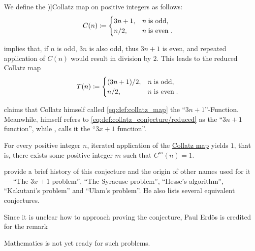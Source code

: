 \begin{definition}\label{def:collatz_map}
  We define the \term[en=Collatz function (\cite[1]{Lagarias2021CollatzOverview})]{Collatz map} on positive integers as follows:
  \begin{equation}\label{eq:def:collatz_map}
    C(n) \coloneqq \begin{cases}
      3n + 1, &n \T{is odd}, \\
      n / 2,  &n \T{is even}.
    \end{cases}
  \end{equation}
\end{definition}
\begin{comments}
  \item {} implies that, if \( n \) is odd, \( 3n \) is also odd, thus \( 3n + 1 \) is even, and repeated application of \( C(n) \) would result in division by \( 2 \). This leads to the reduced Collatz map
  \begin{equation}\label{eq:def:collatz_conjecture/reduced}
    T(n) \coloneqq \begin{cases}
      (3n + 1) / 2, &n \T{is odd}, \\
      n / 2,        &n \T{is even}.
    \end{cases}
  \end{equation}

  \item {} claims that Collatz himself called \eqref{eq:def:collatz_map} the \enquote{\( 3n + 1 \)}-Function. Meanwhile,  himself refers to \eqref{eq:def:collatz_conjecture/reduced} as the \enquote{\( 3n + 1 \) function}, while , calls it the \enquote{\( 3x + 1 \) function}.
\end{comments}

\begin{conjecture}\label{hyp:collatz_conjecture}
  For every positive integer \( n \), iterated application of the \hyperref[def:collatz_map]{Collatz map} yields \( 1 \), that is, there exists some positive integer \( m \) such that \( C^m(n) = 1 \).
\end{conjecture}
\begin{comments}
  \item {} provide a brief history of this conjecture and the origin of other names used for it --- \enquote{The \( 3x + 1 \) problem}, \enquote{The Syracuse problem}, \enquote{Hesse's algorithm}, \enquote{Kakutani's problem} and \enquote{Ulam's problem}. He also lists several equivalent conjectures.

  Since it is unclear how to approach proving the conjecture, Paul Erd\"os is credited for the remark
  \begin{displayquote}
    Mathematics is not yet ready for such problems.
  \end{displayquote}
\end{comments}

